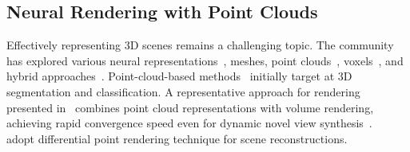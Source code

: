 \documentclass[10pt,twocolumn,letterpaper]{article}
\begin{document}

\subsection{Neural Rendering with Point Clouds}\label{subsec:neural rendering with point clouds}
Effectively representing 3D scenes remains a challenging topic. The community has explored various neural representations~\cite{mildenhall2021nerf}, \eg meshes, point clouds~\cite{pointnerf}, voxels~\cite{fridovich2022plenoxels}, and hybrid approaches~\cite{dvgo,instantngp}. Point-cloud-based methods~\cite{qi2017pointnet,qi2017pointnet++,yu2018pu,liu2019meteornet} initially target at 3D segmentation and classification. A representative approach for rendering presented in~\cite{pointnerf, abou2022particlenerf} combines point cloud representations with volume rendering, achieving rapid convergence speed even for dynamic novel view synthesis~\cite{zhou2024dynpoint,park2024point}. ~\cite{keselman2023flexibleTechniquesDifferentiableRendering,keselman2022approximatedifferentiablerenderingwithalgebraicsurfaces,ruckert2022adop} adopt differential point rendering technique for scene reconstructions. 
\end{document}
